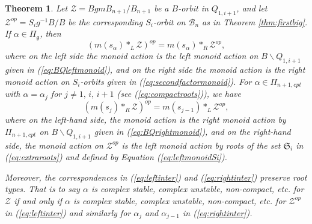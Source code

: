 \documentclass[12pt]{amsart}
\numberwithin{equation}{section}
\newtheorem{thm}{Theorem}[section]
\newcommand{\cZ}{{\mathcal Z}}
\newcommand{\fg}{\mbox{${\mathfrak g}$}}
\newcommand{\B}{\mathcal{B}}
\newcommand{\ms}{m(s_{\alpha})}
\begin{document}
 \begin{thm}\label{thm:monoidcorresp}
 Let $\cZ=Bgm B_{n+1}/ B_{n+1}$ be a $B$-orbit in $Q_{1,i+1}$, and let ${\cZ}^{op}=S_{i} g^{-1} B/B$ be the corresponding $S_{i}$-orbit on $\B_{n}$ as in Theorem \ref{thm:firstbig}.  
If $\alpha \in \Pi_{\fg}$, then 
 \begin{equation}\label{eq:leftinter}
(\ms*_{L}\cZ)^{op}=\ms*_{R}{\cZ}^{op},
 \end{equation}
 where on the left side the monoid action is the left monoid action on $B\backslash Q_{1,i+1}$ given in (\ref{eq:BQleftmonoid}), and on the right side the monoid action is the right monoid action on $S_{i}$-orbits given in (\ref{eq:secondfactormonoid}).  
 For $\alpha\in\Pi_{n+1,cpt}$ with $\alpha=\alpha_{j}$ for $j\neq 1,\, i,\, i+1$ (see (\ref{eq:compactroots})), we have
 \begin{equation}\label{eq:rightinter}
(m(s_{j})*_{R}\cZ)^{op}=m(s_{j-1})*_{L} {\cZ}^{op},
 \end{equation}
 where on the left-hand side, the monoid action is the right monoid action by $\Pi_{n+1,cpt}$ on $B\backslash Q_{1,i+1}$ given in (\ref{eq:BQrightmonoid}), and on the right-hand side, the monoid action on ${\cZ}^{op}$ is the left monoid action by roots of the set $\mathfrak{S}_i$ in (\ref{eq:extraroots}) and defined by Equation (\ref{eq:leftmonoidSi}).
 
 Moreover, the correspondences in (\ref{eq:leftinter}) and (\ref{eq:rightinter}) preserve root types.  That is to say $\alpha$ is complex stable, complex unstable, non-compact, etc. for $\cZ$ if and only if $\alpha$ is complex stable, complex unstable, non-compact, etc. for ${\cZ}^{op}$ in (\ref{eq:leftinter}) and similarly for $\alpha_{j}$ and $\alpha_{j-1}$ in (\ref{eq:rightinter}). 
 \end{thm}
 
\end{document}
